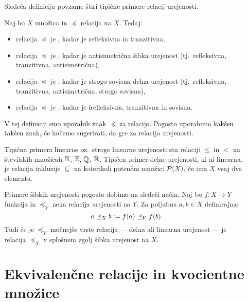 		Sledeča definicija povzame štiri tipične primere relacij urejenosti.
		
		\begin{definicija}
			Naj bo $X$ množica in $\preceq$ relacija na $X$. Tedaj:
			\begin{itemize}
				\item
					relacija $\preceq$ je , kadar je refleksivna in tranzitivna,
				\item
					relacija $\preceq$ je , kadar je antisimetrična šibka urejenost (tj.~refleksivna, tranzitivna, antisimetrična),
				\item
					relacija $\preceq$ je , kadar je strogo sovisna delna urejenost (tj.~refleksivna, tranzitivna, antisimetrična, strogo sovisna),
				\item
					relacija $\preceq$ je , kadar je irefleksivna, tranzitivna in sovisna.
			\end{itemize}
		\end{definicija}
		
		V tej definiciji smo uporabili znak $\preceq$ za relacijo. Pogosto uporabimo kakšen takšen znak, če hočemo sugerirati, da gre za relacijo urejenosti.
		
		Tipična primera linearne oz.~stroge linearne urejenosti sta relaciji $\leq$ in $<$ na številskih množicah $\mathbb{N}$, $\mathbb{Z}$, $\mathbb{Q}$, $\mathbb{R}$. Tipičen primer delne urejenosti, ki ni linearna, je relacija inkluzije $\subseteq$ na katerikoli potenčni množici $\mathcal{P}(X)$, če ima $X$ vsaj dva elementa.
		
		Primere šibkih urejenosti pogosto dobimo na sledeči način. Naj bo $f\colon X \to Y$ funkcija in $\preceq_Y$ neka relacija urejenosti na $Y$. Za poljubna $a, b \in X$ definirajmo
		\[a \preceq_X b \mathrel{\mathop:}= f(a) \preceq_Y f(b).\]
		Tudi če je $\preceq_Y$ močnejše vrste relacija --- delna ali linearna urejenost --- je relacija $\preceq_X$ v splošnem zgolj šibka urejenost na $X$.
		
		
		
		
		
	
	
	\section{Ekvivalenčne relacije in kvocientne množice}
